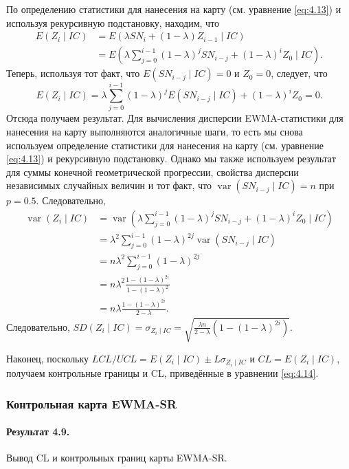 По определению статистики для нанесения на карту (см. уравнение \eqref{eq:4.13}) и используя рекурсивную подстановку, находим, что
\begin{align*}
	E(Z_i \mid IC) &= E\left( \lambda SN_i + (1 - \lambda)Z_{i-1} \mid IC \right) \\
	               &= E\left( \lambda\sum_{j=0}^{i-1}(1 - \lambda)^j SN_{i-j} + (1 - \lambda)^i Z_0 \mid IC \right).
\end{align*}
Теперь, используя тот факт, что \(E(SN_{i-j} \mid IC) = 0\) и \(Z_0 = 0\), следует, что
\[
	E(Z_i \mid IC) = \lambda\sum_{j=0}^{i-1}(1 - \lambda)^j E(SN_{i-j} \mid IC) + (1 - \lambda)^i Z_0 = 0.
\]
Отсюда получаем результат. Для вычисления дисперсии EWMA-статистики для нанесения на карту выполняются аналогичные шаги, то есть мы снова используем определение статистики для нанесения на карту (см. уравнение \eqref{eq:4.13}) и рекурсивную подстановку. Однако мы также используем результат для суммы конечной геометрической прогрессии, свойства дисперсии независимых случайных величин и тот факт, что \(\operatorname{var}(SN_{i-j} \mid IC) = n\) при \(p = 0.5\). Следовательно,
\begin{align*}
	\operatorname{var}(Z_i \mid IC) &= \operatorname{var}\left( \lambda\sum_{j=0}^{i-1}(1 - \lambda)^j SN_{i-j} + (1 - \lambda)^i Z_0 \mid IC \right) \\
	&= \lambda^2\sum_{j=0}^{i-1}(1 - \lambda)^{2j}\operatorname{var}(SN_{i-j} \mid IC) \\
	&= n\lambda^2\sum_{j=0}^{i-1}(1 - \lambda)^{2j} \\
	&= n\lambda^2\frac{1 - (1 - \lambda)^{2i}}{1 - (1 - \lambda)^2} \\
	&= n\lambda\frac{1 - (1 - \lambda)^{2i}}{2 - \lambda}.
\end{align*}
Следовательно, \(SD(Z_i \mid IC) = \sigma_{Z_i \mid IC} = \sqrt{\frac{\lambda n}{2 - \lambda}\left( 1 - (1 - \lambda)^{2i} \right)}\).

Наконец, поскольку \(LCL/UCL = E(Z_i \mid IC) \pm L\sigma_{Z_i \mid IC}\) и \(CL = E(Z_i \mid IC)\), получаем контрольные границы и CL, приведённые в уравнении \eqref{eq:4.14}.

\subsubsection{Контрольная карта EWMA-SR}

\paragraph{Результат 4.9.} Вывод CL и контрольных границ карты EWMA-SR.

